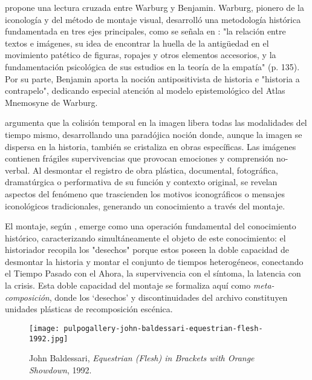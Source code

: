 \textcolor{edit30sept}{\parencite{Guasch2011} propone una lectura cruzada entre Warburg y Benjamin. Warburg, pionero de la iconología y del método de montaje visual, desarrolló una metodología histórica fundamentada en tres ejes principales}, como se señala en \parencite{Warburg2010}: "la relación entre textos e imágenes, su idea de encontrar la huella de la antigüedad en el movimiento patético de figuras, ropajes y otros elementos accesorios, y la fundamentación psicológica de sus estudios en la teoría de la empatía" (p. 135). Por su parte, Benjamin aporta la noción antipositivista de historia e "historia a contrapelo", dedicando especial atención al modelo epistemológico del Atlas Mnemosyne de Warburg.


\parencite{DidiHuberman2011} argumenta que la colisión temporal en la imagen libera todas las modalidades del tiempo mismo, desarrollando una paradójica noción donde, aunque la imagen se dispersa en la historia, también se cristaliza en obras específicas. Las imágenes contienen frágiles supervivencias que provocan emociones y comprensión no-verbal. Al desmontar el registro de obra plástica, documental, fotográfica, dramatúrgica o performativa de su función y contexto original, se revelan aspectos del fenómeno que trascienden los motivos iconográficos o mensajes iconológicos tradicionales, generando un conocimiento a través del montaje.

El montaje, según \parencite{DidiHuberman2011}, emerge como una operación fundamental del conocimiento histórico, caracterizando simultáneamente el objeto de este conocimiento: el historiador recopila los "desechos" porque estos poseen la doble capacidad de desmontar la historia y montar el conjunto de tiempos heterogéneos, conectando el Tiempo Pasado con el Ahora, la supervivencia con el síntoma, la latencia con la crisis. \textcolor{edit30sept}{Esta doble capacidad del montaje se formaliza aquí como \textit{meta-composición}, donde los ‘desechos’ y discontinuidades del archivo constituyen unidades plásticas de recomposición escénica.}


\begin{figure}[ht]
    \centering
    \texttt{[image: pulpogallery-john-baldessari-equestrian-flesh-1992.jpg]}
    \caption{John Baldessari, \textit{Equestrian (Flesh) in Brackets with Orange Showdown}, 1992.}
    \label{fig:baldessari_equestrian}
\end{figure}


